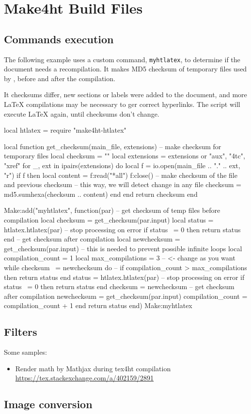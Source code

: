 \chapter{Make4ht Build Files}
\label{sec:make4ht-build-files}
\section{Commands execution}

The following example uses a custom command, \texttt{myhtlatex}, to 
determine if the document needs a recompilation. It makes MD5 checksum
of temporary files used by \texfourht{}, before and after the compilation.

It checksums differ, new sections or labels were added to the document, 
and more \LaTeX{} compilations may be necessary to ger correct hyperlinks.
The script will execute \LaTeX{} again, until checksums don't change.


\begin{luasource}
local htlatex = require "make4ht-htlatex"

local function get_checksum(main_file, extensions)
  -- make checksum for temporary files
  local checksum = ""
  local extensions = extensions or {"aux", "4tc", "xref"}
  for _, ext in ipairs(extensions) do
    local f = io.open(main_file .. "." .. ext, "r")
    if f then
      local content = f:read("*all")
      f:close()
      -- make checksum of the file and previous checksum
      -- this way, we will detect change in any file
      checksum = md5.sumhexa(checksum .. content)
    end
  end
  return checksum
end

Make:add("myhtlatex", function(par)
  -- get checksum of temp files before compilation
  local checksum = get_checksum(par.input)
  local status = htlatex.htlatex(par)
  -- stop processing on error
  if status ~= 0 then return status end
  -- get checksum after compilation
  local newchecksum = get_checksum(par.input)
  -- this is needed to prevent possible infinite loops
  local compilation_count = 1
  local max_compilations  = 3 -- <- change as you want
  while checksum ~= newchecksum do
    -- 
    if compilation_count > max_compilations then return status end
    status = htlatex.htlatex(par)
    -- stop processing on error
    if status ~= 0 then return status end
    checksum = newchecksum
    -- get checksum after compilation
    newchecksum = get_checksum(par.input)
    compilation_count = compilation_count + 1
  end
  return status
end)
Make:myhtlatex {}
\end{luasource}

\section{Filters}

Some samples:

\begin{itemize}
  \item Render math by Mathjax during tex4ht compilation \url{https://tex.stackexchange.com/a/402159/2891}
\end{itemize}
\section{Image conversion}
